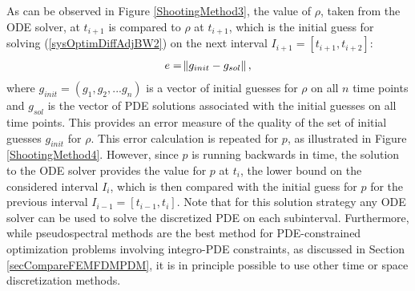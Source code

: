 %

As can be observed in Figure \ref{ShootingMethod3}, the value of $\rho$, taken from the ODE solver, at $t_{i+1}$ is compared to $\rho$ at $t_{i+1}$, which is the initial guess for solving (\ref{sysOptimDiffAdjBW2}) on the next interval $I_{i+1}=[t_{i+1},t_{i+2}]$:
\begin{align}\label{eqnErrorINitoptiguess}
e= \norm{g_{init}-g_{sol}},
\end{align} 
where $g_{init}=(g_1,g_2,...g_n)$ is a vector of initial guesses for $\rho$ on all $n$ time points and $g_{sol}$ is the vector of PDE solutions associated with the initial guesses on all time points.
This provides an error measure of the quality of the set of initial guesses $g_{init}$ for $\rho$. This error calculation is repeated for ${p}$, as illustrated in Figure \ref{ShootingMethod4}. However, since ${p}$ is running backwards in time, the solution to the ODE solver provides the value for ${p}$ at $t_i$, the lower bound on the considered interval $I_i$, which is then compared with the initial guess for ${p}$ for the previous interval $I_{i-1}=[t_{i-1},t_i]$.
Note that for this solution strategy any ODE solver can be used to solve the discretized PDE on each subinterval. Furthermore, while pseudospectral methods are the best method for PDE-constrained optimization problems involving integro-PDE constraints, as discussed in Section \ref{secCompareFEMFDMPDM}, it is in principle possible to use other time or space discretization methods.
